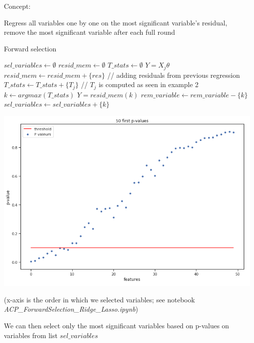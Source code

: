 \vspace{5mm}

Concept: 

Regress all variables one by one on the most significant variable's residual, remove the most significant variable after each full round

\vspace{20mm}

\begin{algorithm}
\caption{Forward selection}
\begin{algorithmic}
\State $sel \_ variables \leftarrow \emptyset$
\State $resid \_mem \leftarrow \emptyset$
\State $T \_stats \leftarrow \emptyset$
\State $Y = X_j\theta$
\State $resid \_mem \leftarrow resid \_mem + \{res\}$ // adding residuals from previous regression
\State $T \_ stats \leftarrow T \_stats + \{T_j\}$ // $T_j$ is computed as seen in example 2
\EndFor
\State $k \leftarrow argmax(T \_ stats)$
\State $Y = resid \_ mem (k)$
\State $rem \_ variable \leftarrow rem \_ variable - \{k\}$
\State $sel \_ variables \leftarrow sel \_ variables + \{k\}$
\EndFor
\end{algorithmic}
\end{algorithm}

\begin{center}
\includegraphics[scale=0.5]{forward_sel_pval.png}
\end{center}

(x-axis is the order in which we selected variables; see notebook \textit{ACP\_ForwardSelection\_Ridge\_Lasso.ipynb})

We can then select only the most significant variables based on p-values on variables from list $sel \_ variables$

